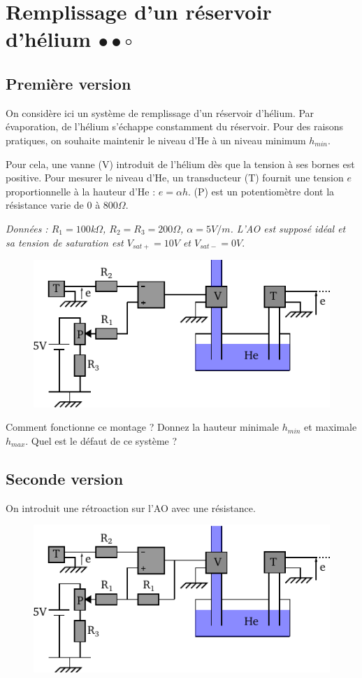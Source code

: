 \documentclass{report}
\begin{document}
\newpage

\section*{Remplissage d'un réservoir d'hélium $\bullet\bullet\circ$}
\subsection*{Première version}
On considère ici un système de remplissage d'un réservoir d'hélium. Par évaporation, de l'hélium s'échappe constamment du réservoir. Pour des raisons pratiques, on souhaite maintenir le niveau d'He à un niveau minimum $h_{min}$.

Pour cela, une vanne (V) introduit de l'hélium dès que la tension à ses bornes est positive. Pour mesurer le niveau d'He, un transducteur (T) fournit une tension $e$ proportionnelle à la hauteur d'He : $e= \alpha h$. (P) est un potentiomètre dont la résistance varie de $0$ à $800\Omega$.

\textit{Données : $R_{1} = 100$k$\Omega$, $R_{2}=R_{3}=200\Omega$, $\alpha = 5V/m$. L'AO est supposé idéal et sa tension de saturation est $V_{sat+}=10V$ et $V_{sat-}=0V.$}

\begin{figure}[!h]
\centering
\includegraphics[width=0.8\linewidth]{circuit_10.pdf}
\end{figure}

Comment fonctionne ce montage ? Donnez la hauteur minimale $h_{min}$ et maximale $h_{max}$. Quel est le défaut de ce système ?

\subsection*{Seconde version}
On introduit une rétroaction sur l'AO avec une résistance.

\begin{figure}[!h]
\centering
\includegraphics[width=0.8\linewidth]{circuit_11.pdf}
\end{figure}
\end{document}
